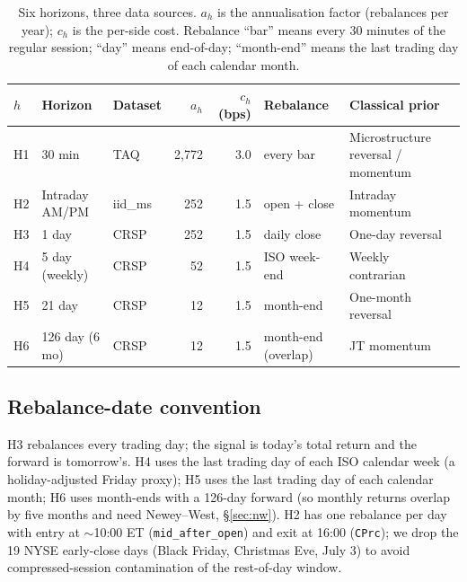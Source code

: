 \documentclass[10pt,conference,compsoc]{IEEEtran}
\begin{document}
\begin{table}[t]
\centering
\caption{Six horizons, three data sources. $a_h$ is the annualisation
factor (rebalances per year); $c_h$ is the per-side cost. Rebalance
``bar'' means every 30 minutes of the regular session; ``day''
means end-of-day; ``month-end'' means the last trading day of each
calendar month.}
\label{tab:horizons}
\small
\begin{tabular}{@{}l l l r r l l@{}}
\toprule
\textbf{$h$} & \textbf{Horizon} & \textbf{Dataset} & \textbf{$a_h$} &
\textbf{$c_h$ (bps)} & \textbf{Rebalance} & \textbf{Classical prior} \\
\midrule
H1 & 30 min          & TAQ       & 2{,}772 & 3.0 & every bar          & Microstructure reversal / momentum~\cite{roll1984,gao2018} \\
H2 & Intraday AM/PM  & iid\_ms   & 252     & 1.5 & open + close       & Intraday momentum~\cite{gao2018} \\
H3 & 1 day           & CRSP      & 252     & 1.5 & daily close        & One-day reversal~\cite{lehmann1990} \\
H4 & 5 day (weekly)  & CRSP      & 52      & 1.5 & ISO week-end       & Weekly contrarian~\cite{lo1990} \\
H5 & 21 day          & CRSP      & 12      & 1.5 & month-end          & One-month reversal~\cite{jegadeesh1990} \\
H6 & 126 day (6 mo)  & CRSP      & 12      & 1.5 & month-end (overlap)& JT momentum~\cite{jt1993} \\
\bottomrule
\end{tabular}
\end{table}

\subsection{Rebalance-date convention}

H3 rebalances every trading day; the signal is today's total return
and the forward is tomorrow's. H4 uses the last trading day of each
ISO calendar week (a holiday-adjusted Friday proxy); H5 uses the last
trading day of each calendar month; H6 uses month-ends with a 126-day
forward (so monthly returns overlap by five months and need
Newey--West, \S\ref{sec:nw}). H2 has one rebalance per day with entry
at $\sim$10:00 ET (\texttt{mid\_after\_open}) and exit at 16:00
(\texttt{CPrc}); we drop the 19 NYSE early-close days
(Black Friday, Christmas Eve, July 3) to avoid compressed-session
contamination of the rest-of-day window.
\end{document}

